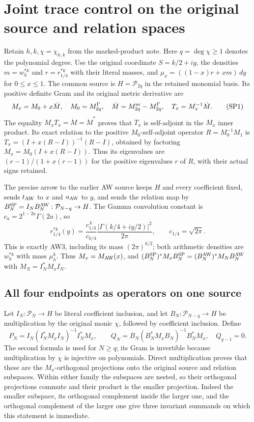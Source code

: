 \section{Joint trace control on the original source and relation spaces}
\label{sec:signed-projection-control}

Retain \(h,k,\chi=\chi_{h,k}\) from the marked-product note. Here
\(q=\deg\chi\geq1\) denotes the polynomial degree. Use the original
coordinate \(S=k/2+iy\), the densities \(m=w_h^{*k}\) and
\(r=r_{1/4}^{*k}\) with their literal masses, and
\(\mu_x=((1-x)r+xm)\,dy\) for \(0\leq x\leq1\).
The common source is \(H=\mathcal P_{2q}\) in the retained monomial basis.
Its positive definite Gram and its original metric derivative are
\[
 M_x=M_0+x\dot M,\quad M_0=M^\Gamma_{2q},\quad
 \dot M=M^{\rm ar}_{2q}-M^\Gamma_{2q},\quad
 T_x=M_x^{-1}\dot M .
 \tag{SP1}
\]
The equality \(M_xT_x=\dot M=\dot M^*\) proves that \(T_x\) is
self-adjoint in the \(M_x\) inner product. Its exact relation to
the positive \(M_0\)-self-adjoint operator \(R=M_0^{-1}M_1\) is
\(T_x=(I+x(R-I))^{-1}(R-I)\), obtained by factoring
\(M_x=M_0(I+x(R-I))\). Thus its eigenvalues are
\((r-1)/(1+x(r-1))\) for the positive eigenvalues \(r\) of \(R\),
with their actual signs retained.

The precise arrow to the earlier AW source keeps $H$ and every
coefficient fixed, sends $t_{\rm AW}$ to $x$ and $u_{\rm AW}$ to $y$,
and sends the relation map by
$B_N^{\rm SP}=I_NB_N^{\rm AW}:\mathcal P_{N-q}\to H$.
The Gamma convolution constant is
$c_a=2^{1-2a}\Gamma(2a)$, so
\[
 r_{1/4}^{*k}(y)
 =\frac{c_{1/4}^{\,k}}{c_{k/4}}
             \frac{|\Gamma(k/4+iy/2)|^2}{2\pi},\qquad
 c_{1/4}=\sqrt{2\pi}.
 \tag{SP1a}
\]
This is exactly AW3, including its mass $(2\pi)^{k/2}$; both
arithmetic densities are $w_h^{*k}$ with mass $\mu_h^k$.
Thus $M_x=M_{\rm AW}(x)$, and
$(B_N^{\rm SP})^*M_xB_N^{\rm SP}=(B_N^{\rm AW})^*M_NB_N^{\rm AW}$
with $M_N=I_N^*M_xI_N$.


\subsection{All four endpoints as operators on one source}
Let \(I_N:\mathcal P_N\to H\) be literal coefficient inclusion, and
let \(B_N:\mathcal P_{N-q}\to H\) be multiplication by the original
monic \(\chi\), followed by coefficient inclusion. Define
\[
 P_N=I_N(I_N^*M_xI_N)^{-1}I_N^*M_x,\qquad
 Q_N=B_N(B_N^*M_xB_N)^{-1}B_N^*M_x,\quad Q_{q-1}=0 .
 \tag{SP2}
\]
The second formula is used for \(N\geq q\); its Gram is invertible
because multiplication by \(\chi\) is injective on polynomials.
Direct multiplication proves that these are the \(M_x\)-orthogonal
projections onto the original source and relation subspaces.
Within either family the subspaces are nested, so their orthogonal
projections commute and their product is the smaller projection.
Indeed the smaller subspace, its orthogonal complement inside the
larger one, and the orthogonal complement of the larger one give
three invariant summands on which this statement is immediate.

